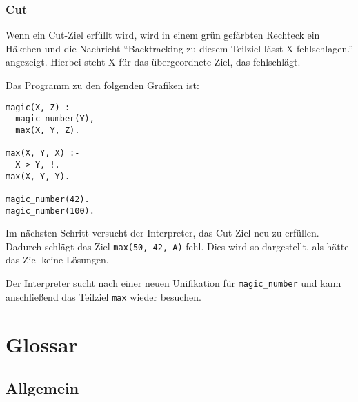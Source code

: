 \documentclass[parskip=full,11pt,twoside]{scrartcl}
\begin{document}
\begin{minipage}{\linewidth}
\end{minipage}

\subsubsection{Cut}

Wenn ein Cut-Ziel erfüllt wird, wird in einem grün gefärbten Rechteck ein Häkchen und die Nachricht \enquote{Backtracking zu diesem Teilziel lässt X fehlschlagen.} angezeigt.
Hierbei steht X für das übergeordnete Ziel, das fehlschlägt.

Das Programm zu den folgenden Grafiken ist:

\begin{lstlisting}
magic(X, Z) :-
  magic_number(Y),
  max(X, Y, Z).

max(X, Y, X) :-
  X > Y, !.
max(X, Y, Y).

magic_number(42).
magic_number(100).
\end{lstlisting}

\begin{minipage}{\linewidth}
\end{minipage}

Im nächsten Schritt versucht der Interpreter, das Cut-Ziel neu zu erfüllen.
Dadurch schlägt das Ziel \texttt{max(50, 42, A)} fehl.
Dies wird so dargestellt, als hätte das Ziel keine Lösungen.

\begin{minipage}{\linewidth}
\end{minipage}

Der Interpreter sucht nach einer neuen Unifikation für \texttt{magic\_number} und kann anschließend das Teilziel \texttt{max} wieder besuchen.

\section{Glossar}
\label{glossary}

\subsection{Allgemein}
\end{document}
